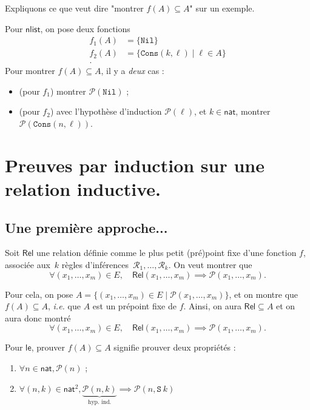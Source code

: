 \documentclass[../main]{subfiles}
\begin{document}
  \begin{exm}
    Expliquons ce que veut dire "montrer $f(A) \subseteq A$" sur un exemple.

    Pour $\mathsf{nlist}$, on pose deux fonctions
    \begin{align*}
      f_1(A) &= \{\mathtt{Nil}\}\\
      f_2(A) &= \{\mathtt{Cons}(k,\ell) \mid \ell \in A\}  \\
    .\end{align*}
    Pour montrer $f(A) \subseteq A$, il y a \textit{deux} cas :
    \begin{itemize}
      \item (pour $f_1$) montrer $\mathcal{P}(\mathtt{Nil})$ ;
      \item (pour $f_2$) avec l'hypothèse d'induction $\mathcal{P}(\ell)$, et $k \in \mathsf{nat}$, montrer $\mathcal{P}(\mathtt{Cons}(n,\ell))$.
    \end{itemize}
  \end{exm}

  \section{Preuves par induction sur une relation inductive.}

  \subsection{Une première approche...}

  \begin{rmk}
    Soit $\mathsf{Rel}$ une relation définie comme le plus petit (pré)point fixe d'une fonction $f$, associée aux~$k$ règles d'inférences~$\mathcal{R}_1,\ldots,\mathcal{R}_k$.
    On veut montrer que \[
      \forall (x_1,\ldots,x_m) \in E, \quad \mathsf{Rel}(x_1,\ldots,x_m) \implies \mathcal{P}(x_1, \ldots, x_m)
    .\]

    Pour cela, on pose $A = \{(x_1,\ldots,x_m) \in E\mid  \mathcal{P}(x_1,\ldots,x_m)\}$, et on montre que $f(A) \subseteq A$, \textit{i.e.} que $A$ est un prépoint fixe de $f$.
    Ainsi, on aura $\mathsf{Rel} \subseteq A$ et on aura donc montré \[
      \forall (x_1,\ldots,x_m) \in E, \quad \mathsf{Rel}(x_1,\ldots,x_m) \implies \mathcal{P}(x_1, \ldots, x_m)
    .\] 
  \end{rmk}

  \begin{exm}\label{exm:rel-le-indu-naif}
    Pour $\mathsf{le}$, prouver $f(A) \subseteq A$ signifie prouver deux propriétés :
    \begin{enumerate}
      \item $\forall n \in \mathsf{nat}, \mathcal{P}(n)$ ;
      \item $\forall (n,k) \in \mathsf{nat}^2, \underbrace{\mathcal{P}(n,k)}_\text{hyp. ind.} \implies \mathcal{P}(n, \mathtt{S}\ k)$
    \end{enumerate}
  \end{exm}
\end{document}
